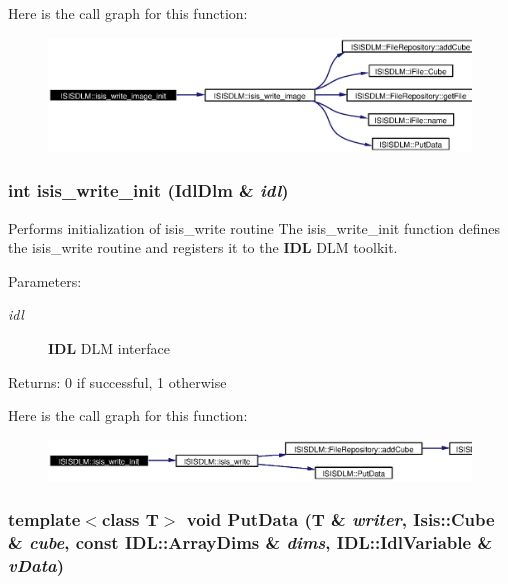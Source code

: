 Here is the call graph for this function:\begin{figure}[H]
\begin{center}
\leavevmode
\includegraphics[width=378pt]{namespaceISISDLM_a38_cgraph}
\end{center}
\end{figure}
\subsubsection{\setlength{\rightskip}{0pt plus 5cm}int isis\_\-write\_\-init (Idl\-Dlm \& {\em idl})}\label{namespaceISISDLM_a36}


Performs initialization of isis\_\-write routine The isis\_\-write\_\-init function defines the isis\_\-write routine and registers it to the {\bf IDL} DLM toolkit. \begin{Desc}
\item[Parameters:]
\begin{description}
\item[{\em idl}]{\bf IDL} DLM interface \end{description}
\end{Desc}
\begin{Desc}
\item[Returns:]0 if successful, 1 otherwise \end{Desc}


Here is the call graph for this function:\begin{figure}[H]
\begin{center}
\leavevmode
\includegraphics[width=341pt]{namespaceISISDLM_a36_cgraph}
\end{center}
\end{figure}
\subsubsection{\setlength{\rightskip}{0pt plus 5cm}template$<$class T$>$ void Put\-Data (T \& {\em writer}, Isis::Cube \& {\em cube}, const IDL::Array\-Dims \& {\em dims}, IDL::Idl\-Variable \& {\em v\-Data})}\label{namespaceISISDLM_a6}


